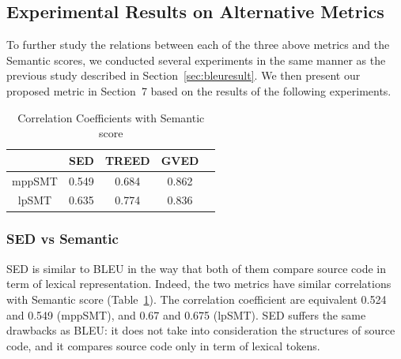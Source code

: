 \subsection{Experimental Results on Alternative Metrics}

To further study the relations between each of the three above metrics
and the Semantic scores, we conducted several experiments in the same
manner as the previous study described in
Section~\ref{sec:bleuresult}. We then present our proposed metric
in Section~7 based on the results of the following experiments.


\begin{table}
\caption{Correlation Coefficients with Semantic score}
\begin{tabular}{|c|c|c|c|c|}
\hline
 & SED & TREED & GVED\\
\hline
mppSMT  & 0.549 & 0.684 & 0.862 \\
lpSMT  & 0.635 & 0.774 & 0.836 \\
\hline
\end{tabular}
\label{table:correlation}
\end{table}


\subsubsection{\textbf{SED vs Semantic}}

SED is similar to BLEU in the way that both of them compare source
code in term of lexical representation. Indeed, the two metrics have
similar correlations with Semantic score
(Table~\ref{table:correlation}). The correlation coefficient are
equivalent 0.524 and 0.549 (mppSMT), and 0.67 and 0.675 (lpSMT). SED
suffers the same drawbacks as BLEU: it does not take into
consideration the structures of source code, and it compares source
code only in term of lexical tokens. 

%

